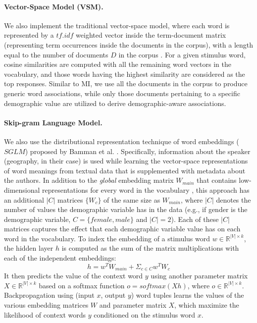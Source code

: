 \documentclass[11pt,letterpaper]{article}
\begin{document}
\paragraph{Vector-Space Model (VSM).}
We also implement the traditional vector-space model, where each word is represented by a $tf.idf$ weighted vector inside the term-document matrix (representing term occurrences inside the documents in the corpus), with a length equal to the number of documents $D$ in the corpus \cite{Salton1986}. %
For a given stimulus word, cosine similarities are computed with all the remaining word vectors in the vocabulary, and those words having the highest similarity are considered as the top responses. 
Similar to MI, we use all the documents in the corpus to produce generic word associations, while only those documents pertaining to a specific demographic value are utilized to derive demographic-aware associations.  

\paragraph{Skip-gram Language Model.}
We also use the distributional representation technique of word embeddings ($SGLM$) proposed by Bamman et al. .
Specifically, information about the speaker (geography, in their case) is used while learning the vector-space representations of word meanings from textual data that is supplemented with metadata about the authors.
In addition to the \textit{global} embedding matrix $W_{main}$ that contains low-dimensional representations for every word in the vocabulary \cite{Mikolov2013a}, this approach has an additional $|C|$ matrices $\{W_{c}\}$ of the same size as $W_{main}$, where $|C|$ denotes the number of values the demographic variable has in the data (e.g., if gender is the demographic variable, $C = \{female, male\}$ and $|C| = 2$). 
Each of these $|C|$ matrices captures the effect that each demographic variable value has on each word in the vocabulary. 
To index the embedding of a stimulus word $w \in \mathbb{R}^{|V|\times k}$, the hidden layer $h$ is computed as the sum of the matrix multiplications with each of the independent embeddings:
\vskip -0.2in
\begin{equation}
h = w^{T}W_{main} + \Sigma_{c \in C}w^{T}W_{c}
\label{eq:hiddenlayer}
\end{equation}
It then predicts the value of the context word $y$ using another parameter matrix $X \in \mathbb{R}^{|V|\times k}$ based on a softmax function $o = softmax(Xh)$, where $o \in \mathbb{R}^{|V|\times k}$.
Backpropagation using (input $x$, output $y$) word tuples learns the values of the various embedding matrices $W$ and parameter matrix $X$, which maximize the likelihood of context words $y$ conditioned on the stimulus word $x$.
\end{document}
